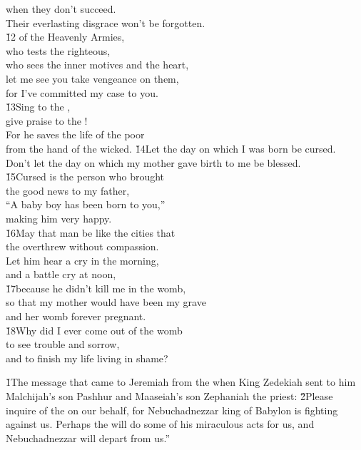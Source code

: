 \begin{poetry}
\poemll    when they don't succeed. \\
\poemlll       Their everlasting disgrace won't be forgotten. \\
\poeml \v{12} of the Heavenly Armies, \\
\poemll    who tests the righteous, \\
\poemll    who sees the inner motives and the heart, \\
\poeml let me see you take vengeance on them, \\
\poemll    for I've committed my case to you. \\
\poeml \v{13}Sing to the , \\
\poemll    give praise to the ! \\
\poeml For he saves the life of the poor \\
\poemll    from the hand of the wicked.
\poeml \v{14}Let the day on which I was born be cursed. \\
\poemll    Don't let the day on which my mother gave birth to me be blessed. \\
\poeml \v{15}Cursed is the person who brought \\
\poemll    the good news to my father, \\
\poeml ``A baby boy has been born to you,'' \\
\poemll    making him very happy. \\
\poeml \v{16}May that man be like the cities that \\
\poemll    the  overthrew without compassion. \\
\poeml Let him hear a cry in the morning, \\
\poemll    and a battle cry at noon, \\
\poeml \v{17}because he didn't kill me in the womb, \\
\poemll    so that my mother would have been my grave \\
\poemlll       and her womb forever pregnant. \\
\poeml \v{18}Why did I ever come out of the womb \\
\poemll    to see trouble and sorrow, \\
\poemlll       and to finish my life living in shame?
\end{poetry}

\v{1}The message that came to Jeremiah from the  when King Zedekiah sent to him Malchijah's son Pashhur and Maaseiah's son Zephaniah the priest: \v{2}Please inquire of the  on our behalf, for Nebuchadnezzar king of Babylon is fighting against us. Perhaps the  will do some of his miraculous acts for us, and Nebuchadnezzar will depart from us.''

